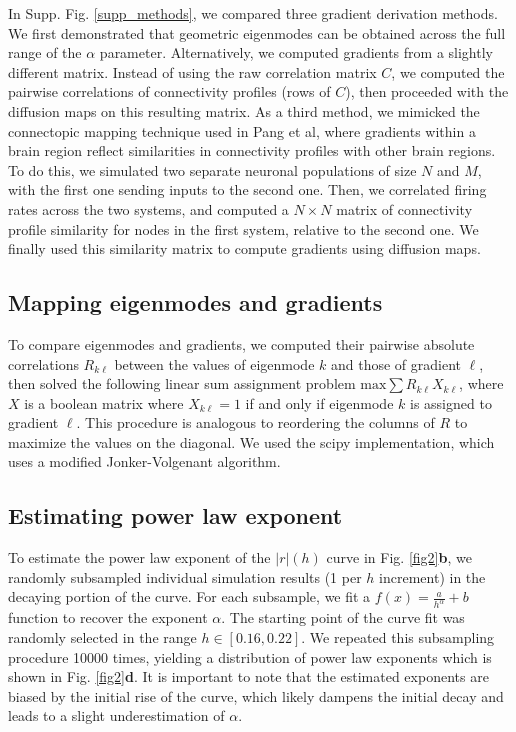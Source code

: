 \documentclass{article}
\begin{document}
In Supp. Fig. \ref{supp_methods}, we compared three gradient derivation methods. We first demonstrated that geometric eigenmodes can be obtained across the full range of the $\alpha$ parameter. Alternatively, we computed gradients from a slightly different matrix. Instead of using the raw correlation matrix $C$, we computed the pairwise correlations of connectivity profiles (rows of $C$), then proceeded with the diffusion maps on this resulting matrix. As a third method, we mimicked the connectopic mapping technique\cite{haak2018connectopic} used in Pang et al\cite{pang2023geometric}, where gradients within a brain region reflect similarities in connectivity profiles with other brain regions. To do this, we simulated two separate neuronal populations of size $N$ and $M$, with the first one sending inputs to the second one. Then, we correlated firing rates across the two systems, and computed a $N\times N$ matrix of connectivity profile similarity for nodes in the first system, relative to the second one. We finally used this similarity matrix to compute gradients using diffusion maps. 

\subsection*{Mapping eigenmodes and gradients}

To compare eigenmodes and gradients, we computed their pairwise absolute correlations $R_{k\ell}$ between the values of eigenmode $k$ and those of gradient $\ell$, then solved the following linear sum assignment problem $\text{max}\sum R_{k\ell}X_{k\ell}$, where $X$ is a boolean matrix where $X_{k\ell}=1$ if and only if eigenmode $k$ is assigned to gradient $\ell$. This procedure is analogous to reordering the columns of $R$ to maximize the values on the diagonal. We used the scipy implementation\cite{virtanen2020scipy}, which uses a modified Jonker-Volgenant algorithm\cite{jonker1988shortest}. 

\subsection*{Estimating power law exponent}

To estimate the power law exponent of the $|r|(h)$ curve in Fig. \ref{fig2}\textbf{b}, we randomly subsampled individual simulation results (1 per $h$ increment) in the decaying portion of the curve. For each subsample, we fit a $f(x)=\frac{a}{h^\alpha}+b$ function to recover the exponent $\alpha$. The starting point of the curve fit was randomly selected in the range $h\in[0.16, 0.22]$. We repeated this subsampling procedure 10000 times, yielding a distribution of power law exponents which is shown in Fig. \ref{fig2}\textbf{d}. It is important to note that the estimated exponents are biased by the initial rise of the curve, which likely dampens the initial decay and leads to a slight underestimation of $\alpha$.
\end{document}
